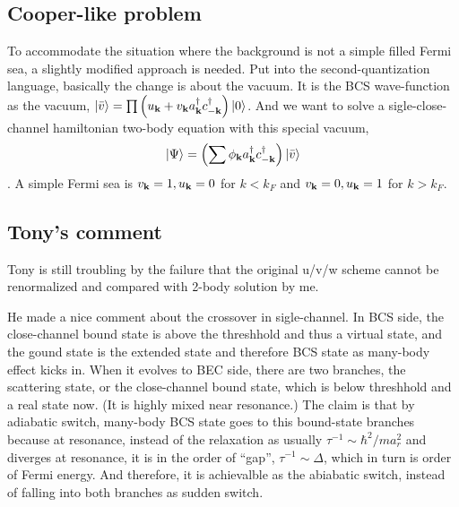 \subsection{Cooper-like problem}
To accommodate the situation where the background is not a simple filled Fermi sea, a slightly modified approach is needed.  Put into the second-quantization language, basically the change is about the vacuum.  It is the BCS wave-function as the vacuum, $\left|\bar{v}\right>=\prod\left(u_{\mathbf{k}}+v_{\mathbf{k}}{a^{\dagger}_{\mathbf{k}}{}c^{\dagger}_{-\mathbf{k}}}\right)\left|0\right>$.   And we want to solve a sigle-close-channel hamiltonian two-body equation with this special vacuum, 
\begin{equation}\label{eq:wfSemiCooper}\left|\Psi\right>=\left(\sum\phi_{\mathbf{k}}{a^{\dagger}_{\mathbf{k}}{}c^{\dagger}_{-\mathbf{k}}}\right)\left|\bar{v}\right>\end{equation}. 
A simple Fermi sea is $v_{\mathbf{k}}=1, u_{\mathbf{k}}=0$ for $k<k_F$ and $v_{\mathbf{k}}=0, u_{\mathbf{k}}=1$ for $k>k_F$.

\subsection{Tony's comment}
Tony is still troubling by the failure that the original u/v/w scheme cannot be renormalized and compared with 2-body solution by me.

He made a nice comment about the crossover in sigle-channel.  In BCS side, the close-channel bound state is above the threshhold and thus a virtual state, and the gound state is the extended state and therefore BCS state as many-body effect kicks in.  When it evolves to BEC side, there are two branches, the scattering state, or the close-channel bound state, which is below threshhold and a real state now. (It is highly mixed near resonance.) The claim is that by adiabatic switch, many-body BCS state goes to this bound-state branches because at resonance, instead of the relaxation as usually $\tau^{-1}\sim{\hbar^2/ma_r^2}$ and diverges at resonance, it is in the order of ``gap'', $\tau^{-1}\sim\Delta$, which in turn is order of Fermi energy.  And therefore, it is achievalble as the abiabatic switch, instead of falling into both branches as sudden switch.  
